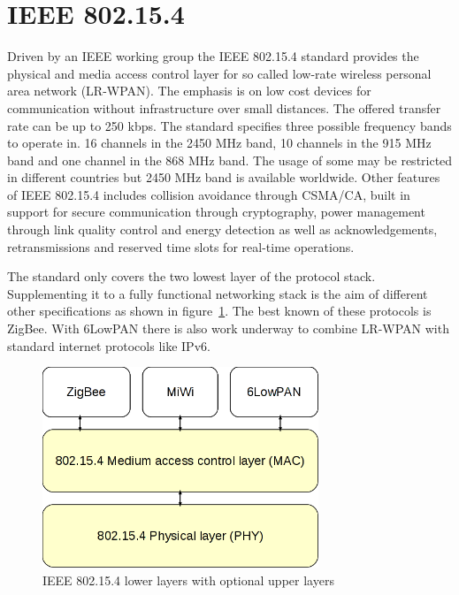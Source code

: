 \section{IEEE 802.15.4}
\label{intro802154}
Driven by an IEEE working group the IEEE 802.15.4 standard provides the physical and
media access control layer for so called low-rate wireless personal area network
(LR-WPAN). The emphasis is on low cost devices for communication without
infrastructure over small distances. The offered transfer rate can be up to 250 kbps.
The standard specifies three possible frequency bands to operate in. 16 channels
in the 2450 MHz band, 10 channels in the 915 MHz band and one channel in the 868
MHz band. The usage of some may be restricted in different countries but 2450 MHz
band is available worldwide.
Other features of IEEE 802.15.4 includes collision avoidance through CSMA/CA, built
in support for secure communication through cryptography, power management through
link quality control and energy detection as well as acknowledgements,
retransmissions and reserved time slots for real-time operations.

The standard only covers the two lowest layer of the protocol stack. Supplementing
it to a fully functional networking stack is the aim of different other
specifications as shown in figure~\ref{fig:802154layer}. The best known of these
protocols is ZigBee. With 6LowPAN there is also work underway to combine
LR-WPAN with standard internet protocols like IPv6.

\begin{figure}
  \begin{center}
    \includegraphics[height=6cm]{images/802154layer}
    \caption{IEEE 802.15.4 lower layers with optional upper layers}
        \label{fig:802154layer}
  \end{center}
\end{figure}

